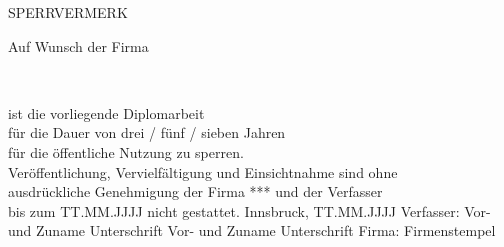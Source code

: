 
\begin{center}
	
{\LARGE SPERRVERMERK}

\vfill
Auf Wunsch der Firma \\ 
\vfill

\ifx {}
  \large \myprojectpartner \\
\fi

\vfill
 ist die vorliegende Diplomarbeit \\

für die Dauer von drei / fünf / sieben Jahren \\
für die öffentliche Nutzung zu sperren. \\
Veröffentlichung, Vervielfältigung und Einsichtnahme sind ohne \\ 
ausdrückliche Genehmigung der Firma *** und der Verfasser \\
bis zum TT.MM.JJJJ nicht gestattet.
\vfill
Innsbruck, TT.MM.JJJJ
\vfill
Verfasser:
\vfill\vfill
Vor- und Zuname	 \hspace{3cm}	Unterschrift
\vfill\vfill
Vor- und Zuname	 \hspace{3cm}	Unterschrift
\vfill\vfill
Firma:  \hspace{3cm} Firmenstempel


\end{center}
